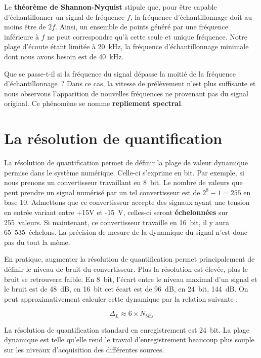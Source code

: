 \documentclass[
]{book}
\begin{document}
Le \textbf{théorème de Shannon-Nyquist} stipule que, pour être capable d'échantillonner un signal de fréquence \(f\), la fréquence d'échantillonnage doit au moins être de \(2f\). Ainsi, un ensemble de points généré par une fréquence inférieure à \(f\) ne peut correspondre qu'à cette seule et unique fréquence. Notre plage d'écoute étant limitée à 20~kHz, la fréquence d'échantillonnage minimale dont nous avons besoin est de 40~kHz.

Que se passe-t-il si la fréquence du signal dépasse la moitié de la fréquence d'échantillonnage~? Dans ce cas, la vitesse de prélèvement n'est plus suffisante et nous observons l'apparition de nouvelles fréquences ne provenant pas du signal original. Ce phénomène se nomme \textbf{repliement spectral}.

\hypertarget{la-ruxe9solution-de-quantification}{%
\section{La résolution de quantification}\label{la-ruxe9solution-de-quantification}}

La résolution de quantification permet de définir la plage de valeur dynamique permise dans le système numérique. Celle-ci s'exprime en bit. Par exemple, si nous prenons un convertisseur travaillant en 8~bit. Le nombre de valeurs que peut prendre un signal numérisé par un tel convertisseur est de \(2^8-1 = 255\) en base 10. Admettons que ce convertisseur accepte des signaux ayant une tension en entrée variant entre +15V et -15~V, celles-ci seront \textbf{échelonnées} sur 255~valeurs. Si maintenant, ce convertisseur travaille en 16~bit, il y aura 65~535~échelons. La précision de mesure de la dynamique du signal n'est donc pas du tout la même.

En pratique, augmenter la résolution de quantification permet principalement de définir le niveau de bruit du convertisseur. Plus la résolution est élevée, plus le bruit se retrouvera faible. En 8~bit, l'écart entre le niveau maximal d'un signal et le bruit est de 48~dB, en 16~bit cet écart est de 96~dB, en 24~bit, 144~dB. On peut approximativement calculer cette dynamique par la relation suivante :

\[ \Delta_L \approx 6 \times N_{bits} \]

La résolution de quantification standard en enregistrement est 24~bit. La plage dynamique est telle qu'elle rend le travail d'enregistrement beaucoup plus souple sur les niveaux d'acquisition des différentes sources.
\end{document}
